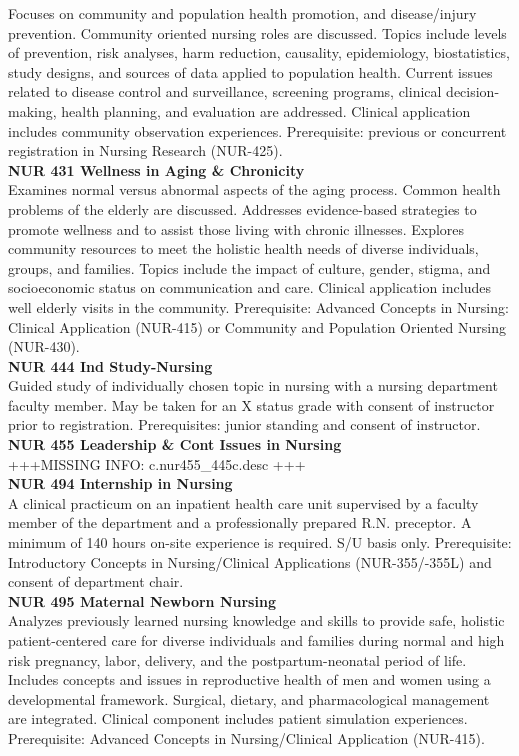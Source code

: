 \documentclass[
  letterpaper,
]{scrbook}
\begin{document}
Focuses on community and population health promotion, and disease/injury
prevention. Community oriented nursing roles are discussed. Topics
include levels of prevention, risk analyses, harm reduction, causality,
epidemiology, biostatistics, study designs, and sources of data applied
to population health. Current issues related to disease control and
surveillance, screening programs, clinical decision-making, health
planning, and evaluation are addressed. Clinical application includes
community observation experiences. Prerequisite: previous or concurrent
registration in Nursing Research (NUR-425).\\
\textbf{NUR 431 Wellness in Aging \& Chronicity}\\
Examines normal versus abnormal aspects of the aging process. Common
health problems of the elderly are discussed. Addresses evidence-based
strategies to promote wellness and to assist those living with chronic
illnesses. Explores community resources to meet the holistic health
needs of diverse individuals, groups, and families. Topics include the
impact of culture, gender, stigma, and socioeconomic status on
communication and care. Clinical application includes well elderly
visits in the community. Prerequisite: Advanced Concepts in Nursing:
Clinical Application (NUR-415) or Community and Population Oriented
Nursing (NUR-430).\\
\textbf{NUR 444 Ind Study-Nursing}\\
Guided study of individually chosen topic in nursing with a nursing
department faculty member. May be taken for an X status grade with
consent of instructor prior to registration. Prerequisites: junior
standing and consent of instructor.\\
\textbf{NUR 455 Leadership \& Cont Issues in Nursing}\\
+++MISSING INFO: c.nur455\_445c.desc +++\\
\textbf{NUR 494 Internship in Nursing}\\
A clinical practicum on an inpatient health care unit supervised by a
faculty member of the department and a professionally prepared R.N.
preceptor. A minimum of 140 hours on-site experience is required. S/U
basis only. Prerequisite: Introductory Concepts in Nursing/Clinical
Applications (NUR-355/-355L) and consent of department chair.\\
\textbf{NUR 495 Maternal Newborn Nursing}\\
Analyzes previously learned nursing knowledge and skills to provide
safe, holistic patient-centered care for diverse individuals and
families during normal and high risk pregnancy, labor, delivery, and the
postpartum-neonatal period of life. Includes concepts and issues in
reproductive health of men and women using a developmental framework.
Surgical, dietary, and pharmacological management are integrated.
Clinical component includes patient simulation experiences.
Prerequisite: Advanced Concepts in Nursing/Clinical Application
(NUR-415).
\end{document}
